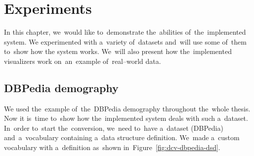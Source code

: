 \chapter{Experiments}
\label{ch:experiments}

In this chapter, we~would like to~demonstrate the~abilities of~the~implemented system. We
experimented with a~variety of~datasets and~will use some of~them to~show how 
the system works. We~will also present how the~implemented visualizers work on~an~example of~real--world data.

\section{DBPedia demography}
We used the~example of~the~DBPedia demography throughout the~whole thesis. Now 
it is~time to~show how the~implemented system deals with such a~dataset. In~order to~start the~conversion, we~need to~have a~dataset (DBPedia) and~a~vocabulary containing a~data structure definition. We~made a~custom vocabulary 
with a~definition as~shown in~Figure~\ref{fig:dcv-dbpedia-dsd}.


